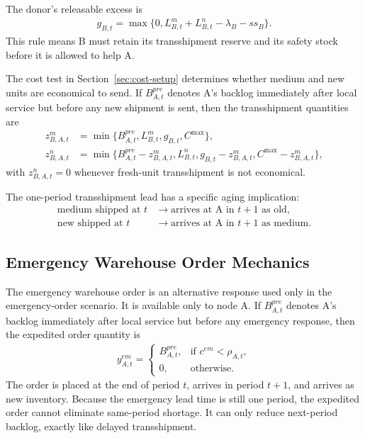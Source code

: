 \documentclass[11pt]{article}
\begin{document}
The donor's releasable excess is
\begin{align}
g_{B,t} = \max\{0, L^m_{B,t} + L^n_{B,t} - \lambda_B - ss_B\}.
\end{align}
This rule means B must retain its transshipment reserve and its safety stock before it is allowed to help A.

The cost test in Section~\ref{sec:cost-setup} determines whether medium and new units are economical to send. If $B_{A,t}^{pre}$ denotes A's backlog immediately after local service but before any new shipment is sent, then the transshipment quantities are
\begin{align}
z^m_{B,A,t} &= \min\{B_{A,t}^{pre}, L^m_{B,t}, g_{B,t}, C^{\max}\},\\
z^n_{B,A,t} &= \min\{B_{A,t}^{pre} - z^m_{B,A,t}, L^n_{B,t}, g_{B,t} - z^m_{B,A,t}, C^{\max} - z^m_{B,A,t}\},
\end{align}
with $z^n_{B,A,t}=0$ whenever fresh-unit transshipment is not economical.

The one-period transshipment lead has a specific aging implication:
\begin{align}
\text{medium shipped at } t &\rightarrow \text{arrives at A in } t+1 \text{ as old},\\
\text{new shipped at } t &\rightarrow \text{arrives at A in } t+1 \text{ as medium}.
\end{align}

\subsection{Emergency Warehouse Order Mechanics}
The emergency warehouse order is an alternative response used only in the emergency-order scenario. It is available only to node A. If $B_{A,t}^{pre}$ denotes A's backlog immediately after local service but before any emergency response, then the expedited order quantity is
\begin{align}
y^{em}_{A,t} =
\begin{cases}
B_{A,t}^{pre}, & \text{if } c^{em}<\rho_{A,t},\\
0, & \text{otherwise}.
\end{cases}
\end{align}
The order is placed at the end of period $t$, arrives in period $t+1$, and arrives as new inventory. Because the emergency lead time is still one period, the expedited order cannot eliminate same-period shortage. It can only reduce next-period backlog, exactly like delayed transshipment.
\end{document}
